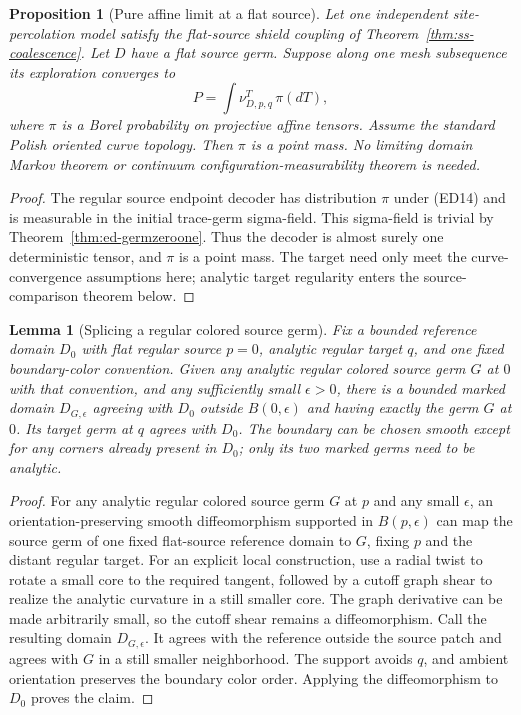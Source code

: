 \documentclass[11pt]{article}
\newtheorem{proposition}[theorem]{Proposition}
\newtheorem{lemma}[theorem]{Lemma}
\theoremstyle{definition}\newtheorem{definition}[theorem]{Definition}
\theoremstyle{remark}\newtheorem{remark}[theorem]{Remark}
\begin{document}
\begin{proposition}[Pure affine limit at a flat source]
\label{prop:ed-resampling}
Let one independent site-percolation model satisfy the flat-source shield
coupling of Theorem~\ref{thm:ss-coalescence}. Let $D$ have a flat source
germ. Suppose along one mesh subsequence its
exploration converges to
\[
 P=\int \nu^T_{D,p,q}\,\pi(dT),
 \tag{ED14}
\]
where $\pi$ is a Borel probability on projective affine tensors. Assume
the standard Polish oriented curve topology. Then $\pi$ is a point mass.
No limiting domain Markov theorem or continuum configuration-measurability
theorem is needed.
\end{proposition}
\begin{proof}
The regular source endpoint decoder has distribution $\pi$ under (ED14)
and is measurable in the initial trace-germ sigma-field. This sigma-field
is trivial by Theorem~\ref{thm:ed-germzeroone}. Thus the decoder is almost
surely one deterministic tensor, and $\pi$ is a point mass. The target
need only meet the curve-convergence assumptions here; analytic target
regularity enters the source-comparison theorem below.
\end{proof}

\begin{lemma}[Splicing a regular colored source germ]
\label{lem:ed-splicing}
Fix a bounded reference domain $D_0$ with flat regular source $p=0$,
analytic regular target $q$, and one fixed boundary-color convention.
Given any analytic regular colored source germ $G$ at $0$ with that
convention, and any sufficiently small $\epsilon>0$, there is a bounded
marked domain $D_{G,\epsilon}$ agreeing with $D_0$ outside
$B(0,\epsilon)$ and having exactly the germ $G$ at $0$. Its target
germ at $q$ agrees with $D_0$. The boundary can be chosen smooth except
for any corners already present in $D_0$; only its two marked germs
need to be analytic.
\end{lemma}
\begin{proof}
For any analytic regular colored source germ $G$ at $p$ and any small
$\epsilon$, an orientation-preserving smooth diffeomorphism supported in
$B(p,\epsilon)$ can map the source germ of one fixed flat-source
reference domain to $G$, fixing $p$ and the distant regular target.
For an explicit local construction, use a radial twist to rotate a small
core to the required tangent, followed by a cutoff graph shear to realize
the analytic curvature in a still smaller core. The graph derivative can
be made arbitrarily small, so the cutoff shear remains a diffeomorphism.
Call the resulting domain $D_{G,\epsilon}$. It agrees with the reference
outside the source patch and agrees with $G$ in a still smaller neighborhood.
The support avoids $q$, and ambient orientation preserves the boundary
color order. Applying the diffeomorphism to $D_0$ proves the claim.
\end{proof}
\end{document}

